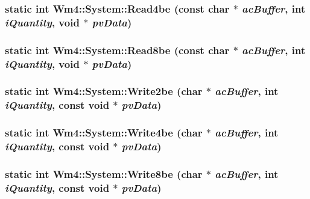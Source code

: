 \subsubsection{\setlength{\rightskip}{0pt plus 5cm}static int Wm4::System::Read4be (const char $\ast$ {\em ac\-Buffer}, int {\em i\-Quantity}, void $\ast$ {\em pv\-Data})\hspace{0.3cm}{\tt  [static]}}\label{classWm4_1_1System_cfd87f4e948a4acfb9c92d5cfe6bd0cb}


\subsubsection{\setlength{\rightskip}{0pt plus 5cm}static int Wm4::System::Read8be (const char $\ast$ {\em ac\-Buffer}, int {\em i\-Quantity}, void $\ast$ {\em pv\-Data})\hspace{0.3cm}{\tt  [static]}}\label{classWm4_1_1System_dbc9deaf9ab9d95a76c6d649e7c1ad12}


\subsubsection{\setlength{\rightskip}{0pt plus 5cm}static int Wm4::System::Write2be (char $\ast$ {\em ac\-Buffer}, int {\em i\-Quantity}, const void $\ast$ {\em pv\-Data})\hspace{0.3cm}{\tt  [static]}}\label{classWm4_1_1System_21d3c0454ee85d06350276f15326f06f}


\subsubsection{\setlength{\rightskip}{0pt plus 5cm}static int Wm4::System::Write4be (char $\ast$ {\em ac\-Buffer}, int {\em i\-Quantity}, const void $\ast$ {\em pv\-Data})\hspace{0.3cm}{\tt  [static]}}\label{classWm4_1_1System_3a6684f9f1ea57ed7707dd4d4803af75}


\subsubsection{\setlength{\rightskip}{0pt plus 5cm}static int Wm4::System::Write8be (char $\ast$ {\em ac\-Buffer}, int {\em i\-Quantity}, const void $\ast$ {\em pv\-Data})\hspace{0.3cm}{\tt  [static]}}\label{classWm4_1_1System_dc67e1bcf6743863281c279fd1a990ad}


